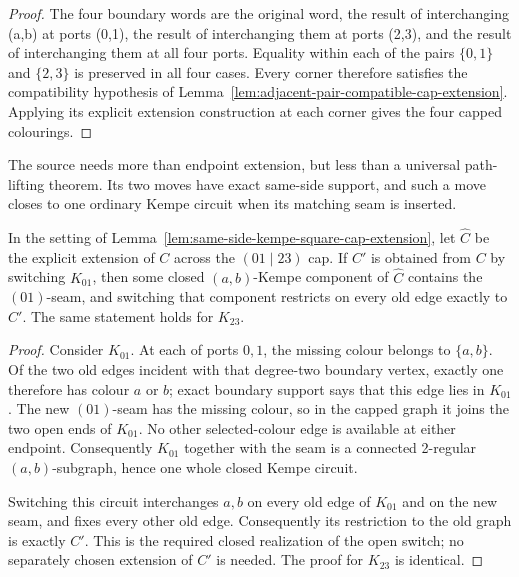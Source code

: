 \begin{proof}
The four boundary words are the original word, the result of interchanging
(a,b) at ports (0,1), the result of interchanging them at ports (2,3),
and the result of interchanging them at all four ports.  Equality within each
of the pairs \(\{0,1\}\) and \(\{2,3\}\) is preserved in all four cases.
Every corner therefore satisfies the compatibility hypothesis of
Lemma~\ref{lem:adjacent-pair-compatible-cap-extension}.  Applying its explicit
extension construction at each corner gives the four capped colourings.
\end{proof}

The source needs more than endpoint extension, but less than a universal
path-lifting theorem.  Its two moves have exact same-side support, and such a
move closes to one ordinary Kempe circuit when its matching seam is inserted.

\begin{lemma}
\label{lem:same-side-kempe-switch-cap-lift}
In the setting of
Lemma~\ref{lem:same-side-kempe-square-cap-extension}, let
\(\widehat C\) be the explicit extension of \(C\) across the
\((01\mid23)\) cap.  If \(C'\) is obtained from \(C\) by switching \(K_{01}\),
then some closed \((a,b)\)-Kempe component of \(\widehat C\) contains the
\((01)\)-seam, and switching that component restricts on every old edge exactly
to \(C'\).  The same statement holds for \(K_{23}\).
\end{lemma}

\begin{proof}
Consider \(K_{01}\).  At each of ports \(0,1\), the missing colour belongs to
\(\{a,b\}\).  Of the two old edges incident with that degree-two boundary
vertex, exactly one therefore has colour \(a\) or \(b\); exact boundary
support says that this edge lies in \(K_{01}\).  The new \((01)\)-seam has the
missing colour, so in the capped graph it joins the two open ends of
\(K_{01}\).  No other selected-colour edge is available at either endpoint.
Consequently \(K_{01}\) together with the seam is a connected 2-regular
\((a,b)\)-subgraph, hence one whole closed Kempe circuit.

Switching this circuit interchanges \(a,b\) on every old edge of \(K_{01}\)
and on the new seam, and fixes every other old edge.  Consequently its
restriction to the old graph is exactly \(C'\).  This is the required closed
realization of the open switch; no separately chosen extension of \(C'\) is
needed.  The proof for \(K_{23}\) is identical.
\end{proof}


